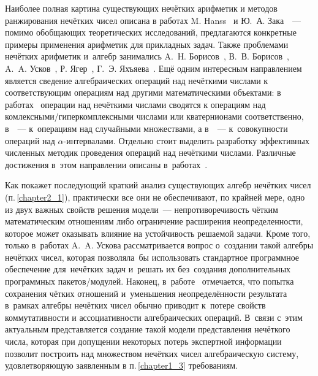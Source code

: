 Наиболее полная картина существующих нечётких арифметик и методов ранжирования нечётких чисел описана в работах M. Hanss~\cite{Hanss, Hanss_Engineering, Hanss_Strict_Arithmetic} и Ю.~А. Зака~\cite{Zak}~--- помимо обобщающих теоретических исследований, предлагаются конкретные примеры применения арифметик для прикладных задач. Также проблемами нечётких арифметик и~алгебр занимались A.~Н. Борисов~\cite{Borisov_Alexeev_Msk, Borisov_Krumberg_Riga}, В.~В. Борисов~\cite{Borisov_Fedulov_Arithmetics}, A.~A. Усков~\cite{Uskov_Complex, Uskov_Hypercomplex, Uskov_Quaternion, Uskov_PPS}, Р. Ягер~\cite{Yager_Filev, Yager_Arithmetics}, Г.~Э. Яхъяева~\cite{Yakhyaeva}. Ещё одним интересным направлением является сведение алгебраических операций над нечёткими числами к соответствующим операциям над другими математическими объектами: в работах~\cite{Uskov_Complex, Uskov_Hypercomplex, Uskov_Quaternion} операции над нечёткими числами сводятся к операциям над комлексными/гиперкомплексными числами или кватернионами соответственно, в~\cite{Orlov_Statistics}~--- к~операциям над случайными множествами, а в~\cite{Levin, Altunin_Semukhin}~--- к~совокупности операций над $\alpha$-интервалами. Отдельно стоит выделить разработку эффективных численных методик проведения операций над нечёткими числами. Различные достижения в~этом направлении описаны в~работах~\cite{Kruglov_Balashov, Bocharnkinov_Ukraine, Gallyamov, Bangladesh, Koroteev_Fuzzy_Arithmetics, Borisov_Krumberg_Riga, Borisov_Alexeev_Msk, Evdokimov}.

Как покажет последующий краткий анализ существующих алгебр нечётких чисел (п.\,\ref{chapter2_1}), практически все они не обеспечивают, по крайней мере, одно из двух важных свойств решения модели~--- непротиворечивость чётким математическим отношениям либо ограничение расширения неопределенности, которое может оказывать влияние на устойчивость решаемой задачи. Кроме того, только в~работах A.~A. Ускова рассматривается вопрос о~создании такой алгебры нечётких чисел, которая позволяла~бы использовать стандартное программное обеспечение для~нечётких задач и~решать их без~создания дополнительных программных пакетов/модулей. Наконец, в~работе~\cite{Kreinovich_100plus1} отмечается, что попытка сохранения чётких отношений и~уменьшения неопределённости результата в~рамках алгебры нечётких чисел обычно приводит к~потере свойств коммутативности и ассоциативности алгебраических операций. В~связи с~этим актуальным представляется создание такой модели представления нечёткого числа, которая при допущении некоторых потерь экспертной информации позволит построить над множеством нечётких чисел алгебраическую систему, удовлетворяющую заявленным в п.\,\ref{chapter1_3} требованиям.


